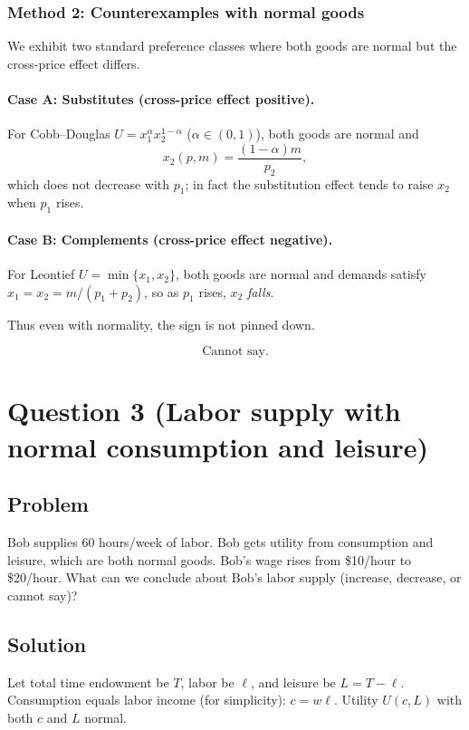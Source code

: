\documentclass[12pt]{article}
\begin{document}
\subsubsection*{Method 2: Counterexamples with normal goods}
We exhibit two standard preference classes where both goods are normal but the cross-price effect differs.

\paragraph{Case A: Substitutes (cross-price effect positive).}
For Cobb--Douglas \(U=x_1^\alpha x_2^{1-\alpha}\) (\(\alpha\in(0,1)\)), both goods are normal and
\[
x_2(p,m)=\frac{(1-\alpha)m}{p_2},
\]
which does not decrease with \(p_1\); in fact the substitution effect tends to raise \(x_2\) when \(p_1\) rises.

\paragraph{Case B: Complements (cross-price effect negative).}
For Leontief \(U=\min\{x_1,x_2\}\), both goods are normal and demands satisfy \(x_1=x_2=m/(p_1+p_2)\),
so as \(p_1\) rises, \(x_2\) \emph{falls}.

Thus even with normality, the sign is not pinned down.

\[
\boxed{\text{Cannot say.}}
\]

\newpage
\section*{Question 3 (Labor supply with normal consumption and leisure)}
\subsection*{Problem}
Bob supplies 60 hours/week of labor. Bob gets utility from consumption and leisure, which are both normal goods.
Bob's wage rises from \$10/hour to \$20/hour.
What can we conclude about Bob's labor supply (increase, decrease, or cannot say)?

\subsection*{Solution}
Let total time endowment be \(T\), labor be \(\ell\), and leisure be \(L=T-\ell\).
Consumption equals labor income (for simplicity): \(c=w\ell\).
Utility \(U(c,L)\) with both \(c\) and \(L\) normal.
\end{document}
